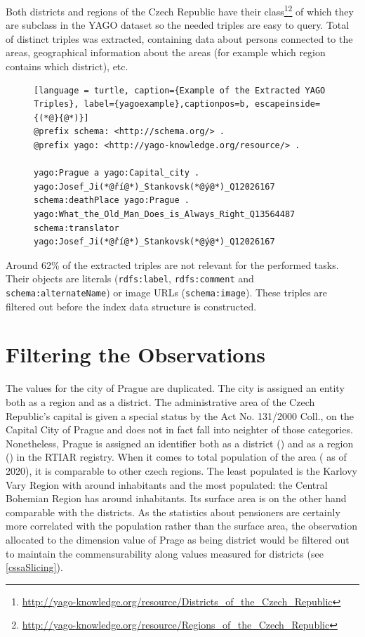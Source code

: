 Both districts and regions of the Czech Republic have their class\footnote{\href{http://yago-knowledge.org/resource/Districts\_of\_the_Czech\_Republic}{http://yago-knowledge.org/resource/Districts\_of\_the\_Czech\_Republic}}\footnote{\href{http://yago-knowledge.org/resource/Regions\_of\_the\_Czech\_Republic}{http://yago-knowledge.org/resource/Regions\_of\_the\_Czech\_Republic}} of which they are subclass in the YAGO dataset so the needed triples are easy to query. Total of  distinct triples was extracted, containing data about persons connected to the areas, geographical information about the areas (for example which region contains which district), etc.

\begin{figure}[h]
\begin{lstlisting}[language = turtle, caption={Example of the Extracted YAGO Triples}, label={yagoexample},captionpos=b, escapeinside={(*@}{@*)}]
@prefix schema: <http://schema.org/> .
@prefix yago: <http://yago-knowledge.org/resource/> .

yago:Prague a yago:Capital_city .
yago:Josef_Ji(*@ří@*)_Stankovsk(*@ý@*)_Q12026167 schema:deathPlace yago:Prague .
yago:What_the_Old_Man_Does_is_Always_Right_Q13564487 schema:translator yago:Josef_Ji(*@ří@*)_Stankovsk(*@ý@*)_Q12026167
\end{lstlisting}
\end{figure}

Around 62\% of the extracted triples are not relevant for the performed tasks. Their objects are literals (\verb|rdfs:label|, \verb|rdfs:comment| and \verb|schema:alternateName|) or image URLs (\verb|schema:image|). These triples are filtered out before the index data structure is constructed.

\section{Filtering the Observations}

The values for the city of Prague are duplicated. The city is assigned an entity both as a region and as a district. The administrative area of the Czech Republic's capital is given a special status by the Act No. 131/2000 Coll., on the Capital City of Prague and does not in fact fall into neighter of those categories. Nonetheless, Prague is assigned an identifier both as a district () and as a region () in the RTIAR registry. When it comes to total population of the area ( as of 2020), it is comparable to other czech regions. The least populated is the Karlovy Vary Region with around  inhabitants and the most populated: the Central Bohemian Region has around  inhabitants. Its surface area is on the other hand comparable with the districts. As the statistics about pensioners are certainly more correlated with the population rather than the surface area, the observation allocated to the dimension value of Prage as being district would be filtered out to maintain the commensurability along values measured for districts (see \ref{cssaSlicing}).

